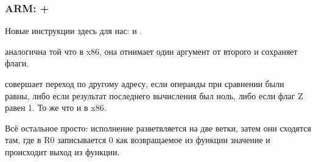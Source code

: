 \subsubsection{ARM: \OptimizingKeil + \ThumbMode}



Новые инструкции здесь для нас: \CMP и .

\CMP аналогична той что в x86, она отнимает один аргумент от второго и сохраняет флаги.

 совершает переход по другому адресу, если операнды при сравнении были равны, либо если результат 
последнего вычисления был ноль, либо если флаг Z равен 1. То же что и \JZ в x86.

Всё остальное просто: исполнение разветвляется на две ветки, затем они сходятся там, где в R0 записывается 0
как возвращаемое из функции значение и происходит выход из функции.

